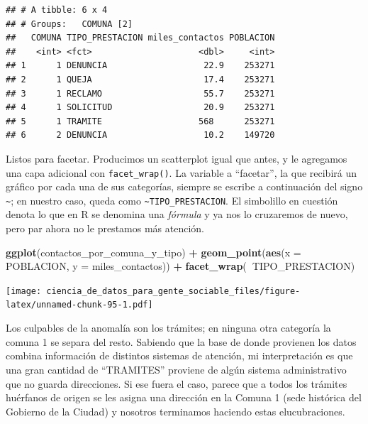 \documentclass[]{book}
\newenvironment{Shaded}{\begin{snugshade}}{\end{snugshade}}
\newcommand{\KeywordTok}[1]{\textcolor[rgb]{0.13,0.29,0.53}{\textbf{#1}}}
\newcommand{\DataTypeTok}[1]{\textcolor[rgb]{0.13,0.29,0.53}{#1}}
\newcommand{\StringTok}[1]{\textcolor[rgb]{0.31,0.60,0.02}{#1}}
\newcommand{\OperatorTok}[1]{\textcolor[rgb]{0.81,0.36,0.00}{\textbf{#1}}}
\newcommand{\NormalTok}[1]{#1}
\begin{document}
\begin{verbatim}
## # A tibble: 6 x 4
## # Groups:   COMUNA [2]
##   COMUNA TIPO_PRESTACION miles_contactos POBLACION
##    <int> <fct>                     <dbl>     <int>
## 1      1 DENUNCIA                   22.9    253271
## 2      1 QUEJA                      17.4    253271
## 3      1 RECLAMO                    55.7    253271
## 4      1 SOLICITUD                  20.9    253271
## 5      1 TRAMITE                   568      253271
## 6      2 DENUNCIA                   10.2    149720
\end{verbatim}

Listos para facetar. Producimos un scatterplot igual que antes, y le
agregamos una capa adicional con \texttt{facet\_wrap()}. La variable a
``facetar'', la que recibirá un gráfico por cada una de sus categorías,
siempre se escribe a continuación del signo \texttt{\textasciitilde{}};
en nuestro caso, queda como \texttt{\textasciitilde{}TIPO\_PRESTACION}.
El simbolillo en cuestión denota lo que en R se denomina una
\emph{fórmula} y ya nos lo cruzaremos de nuevo, pero par ahora no le
prestamos más atención.

\begin{Shaded}
\begin{Highlighting}[]
\KeywordTok{ggplot}\NormalTok{(contactos_por_comuna_y_tipo) }\OperatorTok{+}\StringTok{ }
\StringTok{    }\KeywordTok{geom_point}\NormalTok{(}\KeywordTok{aes}\NormalTok{(}\DataTypeTok{x =}\NormalTok{ POBLACION, }\DataTypeTok{y =}\NormalTok{ miles_contactos)) }\OperatorTok{+}
\StringTok{    }\KeywordTok{facet_wrap}\NormalTok{(}\OperatorTok{~}\NormalTok{TIPO_PRESTACION)}
\end{Highlighting}
\end{Shaded}

\texttt{[image: ciencia\_de\_datos\_para\_gente\_sociable\_files/figure-latex/unnamed-chunk-95-1.pdf]}

Los culpables de la anomalía son los trámites; en ninguna otra categoría
la comuna 1 se separa del resto. Sabiendo que la base de donde provienen
los datos combina información de distintos sistemas de atención, mi
interpretación es que una gran cantidad de ``TRAMITES'' proviene de
algún sistema administrativo que no guarda direcciones. Si ese fuera el
caso, parece que a todos los trámites huérfanos de origen se les asigna
una dirección en la Comuna 1 (sede histórica del Gobierno de la Ciudad)
y nosotros terminamos haciendo estas elucubraciones.
\end{document}
